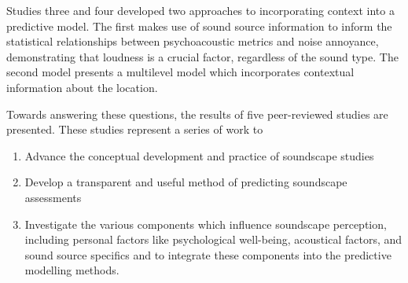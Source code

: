 Studies three and four developed two approaches to incorporating context into a predictive model. The first makes use of sound source information to inform the statistical relationships between psychoacoustic metrics and noise annoyance, demonstrating that loudness is a crucial factor, regardless of the sound type. The second model presents a multilevel model which incorporates contextual information about the location.

Towards answering these questions, the results of five %
peer-reviewed studies are presented. These studies represent a series of work to

\begin{enumerate}
  \item Advance the conceptual development and practice of soundscape studies
  \item Develop a transparent and useful method of predicting soundscape assessments
  \item Investigate the various components which influence soundscape perception, including personal factors like psychological well-being, acoustical factors, and sound source specifics and to integrate these components into the predictive modelling methods.
\end{enumerate}

